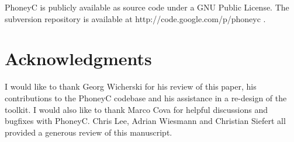 \documentclass[10pt,twocolumn]{article}
\begin{document}
PhoneyC is publicly available as source code under a GNU Public License. The subversion repository is available at http://code.google.com/p/phoneyc .

\section*{Acknowledgments}
\label{acks}

I would like to thank Georg Wicherski for his review of this paper, his contributions to the PhoneyC codebase and his assistance in a re-design of the toolkit. I would also like to thank Marco Cova for helpful discussions and bugfixes with PhoneyC. Chris Lee, Adrian Wiesmann and Christian Siefert all provided a generous review of this manuscript.

\scriptsize


\normalsize
\end{document}
